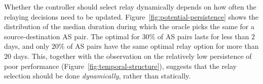 Whether the controller should select relay dynamically depends on how often the relaying decisions need to be updated. 
Figure~\ref{fig:potential-persistence} shows the distribution of the median duration during which the oracle picks the same \option for a source-destination AS pair.
The optimal \option for $30\%$ of AS pairs lasts for less than $2$ days, and only $20\%$ of AS pairs have the same optimal relay option for more than $20$ days. 
This, together with the observation on the relatively low persistence of poor performance (Figure~\ref{fig:temporal-structure}), suggests that the relay selection should be done {\em dynamically}, rather than statically.

